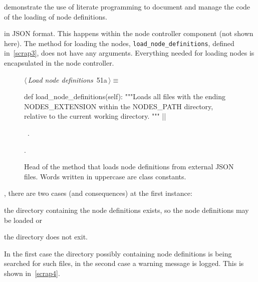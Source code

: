 \documentclass[%
    a4paper,    %
    justified,  %
    nobib,      %
    openany     %
]{tufte-book}
\makeatletter
\renewcommand{\label}[1]{\@tufte@label{##1}}%
\makeatother
\begin{document}
 demonstrate the use of literate programming to
document and manage the code of the loading of node definitions.

 in JSON format.
This happens within the node controller component (not shown here).
The method for loading the nodes,
\texttt{load_node_definitions}, defined
in~\cref{scrap3}, does not have any arguments. Everything
needed for loading nodes is encapsulated in the node controller.

\begin{figure}[!htbp]
  \begin{flushleft} \small
\begin{minipage}{\linewidth}\label{scrap3}\raggedright\small
{} $\langle\,${\itshape Load node definitions}\nobreak\ {\footnotesize {51a}}$\,\rangle\equiv$
\vspace{-1ex}
\begin{pythoncode}
def load_node_definitions(self):
    """Loads all files with the ending NODES_EXTENSION
    within the NODES_PATH directory, relative to
    the current working directory.
    """
|\NWsep|
\end{pythoncode}
\vspace{1.5ex}
\footnotesize
\begin{list}{}{\setlength{\itemsep}{-\parsep}\setlength{\itemindent}{-\leftmargin}}
\item \NWtxtMacroDefBy\ .
\item {\NWtxtMacroNoRef}.

\item{}
\end{list}
\end{minipage}\vspace{4ex}
\end{flushleft}
\caption{Head of the method that loads node definitions from external JSON
    files. Words written in uppercase are class constants.}
\end{figure}

, there are two cases (and
consequences) at the first instance:
\begin{enumerate*}
  \item the directory containing the node definitions exists, so the node
    definitions may be loaded or
  \item the directory does not exit.
\end{enumerate*}
In the first case the directory possibly containing node definitions is being
searched for such files, in the second case a warning message is logged. This is
shown in~\cref{scrap4}.
\end{document}
